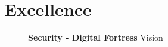 \documentclass[a4paper,11pt]{article}
\newcommand{\project}[1]{\textbf{#1}\xspace}
\newcommand{\SECURITY}{\project{Security - Digital Fortress}}
\newcommand{\TheProject}{\SECURITY}
\begin{document}




\section{Excellence}

\begin{figure}[tp]
  \begin{center}
  \vspace{-5mm}
  \caption{\TheProject{} Vision}
  \label{fig:vision}
  \end{center}
  \end{figure}
\end{document}
